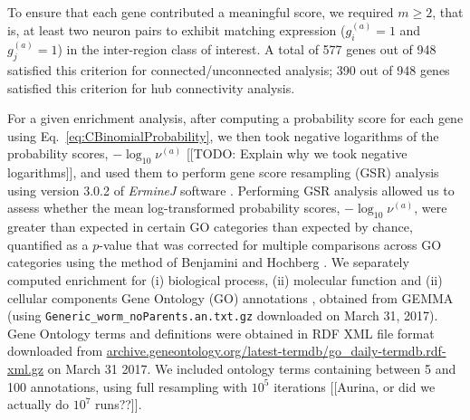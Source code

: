 \documentclass[10pt,letterpaper]{article}
\begin{document}
To ensure that each gene contributed a meaningful score, we required $m \geq 2$, that is, at least two neuron pairs to exhibit matching expression ($g^{(a)}_i = 1$ and $g^{(a)}_j = 1$) in the inter-region class of interest.
A total of 577 genes out of 948 satisfied this criterion for connected/unconnected analysis; 390 out of 948 genes satisfied this criterion for hub connectivity analysis.

For a given enrichment analysis, after computing a probability score for each gene using Eq.~\eqref{eq:CBinomialProbability}, we then took negative logarithms of the probability scores, $-\log_{10}\nu^{(a)}$ [[TODO: Explain why we took negative logarithms]], and used them to perform gene score resampling (GSR) analysis using version 3.0.2 of \emph{ErmineJ} software \cite{Gillis2010}.
Performing GSR analysis allowed us to assess whether the mean log-transformed probability scores, $-\log_{10}\nu^{(a)}$, were greater than expected in certain GO categories than expected by chance, quantified as a $p$-value that was corrected for multiple comparisons across GO categories using the method of Benjamini and Hochberg \cite{Benjamini:1995cd}.
We separately computed enrichment for (i) biological process, (ii) molecular function and (ii) cellular components Gene Ontology (GO) annotations \cite{Ashburner2000}, obtained from GEMMA \cite{Zoubarev2012} (using \texttt{Generic\_worm\_noParents.an.txt.gz} downloaded on March 31, 2017).
Gene Ontology terms and definitions were obtained in RDF XML file format downloaded from \url{archive.geneontology.org/latest-termdb/go_daily-termdb.rdf-xml.gz} on March 31 2017.
We included ontology terms containing between 5 and 100 annotations, using full resampling with $10^{5}$ iterations [[Aurina, or did we actually do $10^{7}$ runs??]].
\end{document}
